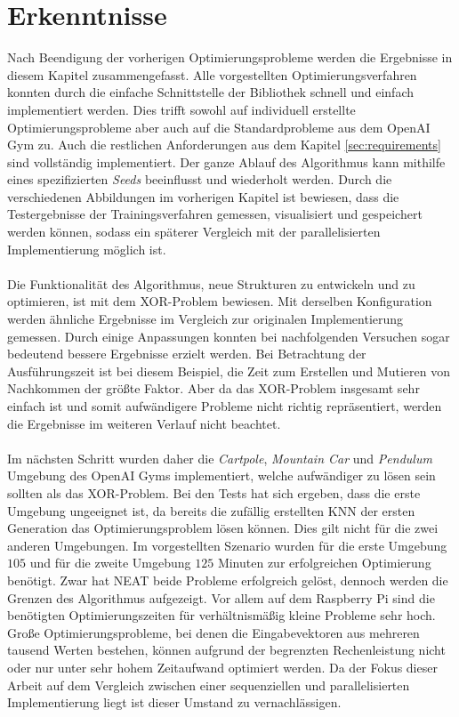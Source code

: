 \section{Erkenntnisse}
\label{sec:analysis_results}
Nach Beendigung der vorherigen Optimierungsprobleme werden die Ergebnisse in diesem Kapitel zusammengefasst. Alle vorgestellten Optimierungsverfahren konnten durch die einfache Schnittstelle der Bibliothek schnell und einfach implementiert werden. Dies trifft sowohl auf individuell erstellte Optimierungsprobleme aber auch auf die Standardprobleme aus dem OpenAI Gym zu. Auch die restlichen Anforderungen aus dem Kapitel \ref{sec:requirements} sind vollständig implementiert. Der ganze Ablauf des Algorithmus kann mithilfe eines spezifizierten \emph{Seeds} beeinflusst und wiederholt werden. Durch die verschiedenen Abbildungen im vorherigen Kapitel ist bewiesen, dass die Testergebnisse der Trainingsverfahren gemessen, visualisiert und gespeichert werden können, sodass ein späterer Vergleich mit der parallelisierten Implementierung möglich ist.
\\\\
Die Funktionalität des Algorithmus, neue Strukturen zu entwickeln und zu optimieren, ist mit dem XOR-Problem bewiesen. Mit derselben Konfiguration werden ähnliche Ergebnisse im Vergleich zur originalen Implementierung gemessen. Durch einige Anpassungen konnten bei nachfolgenden Versuchen sogar bedeutend bessere Ergebnisse erzielt werden. Bei Betrachtung der Ausführungszeit ist bei diesem Beispiel, die Zeit zum Erstellen und Mutieren von Nachkommen der größte Faktor. Aber da das XOR-Problem insgesamt sehr einfach ist und somit aufwändigere Probleme nicht richtig repräsentiert, werden die Ergebnisse im weiteren Verlauf nicht beachtet.
\\\\
Im nächsten Schritt wurden daher die \emph{Cartpole}, \emph{Mountain Car} und \emph{Pendulum} Umgebung des OpenAI Gyms implementiert, welche aufwändiger zu lösen sein sollten als das XOR-Problem. Bei den Tests hat sich ergeben, dass die erste Umgebung ungeeignet ist, da bereits die zufällig erstellten \ac{KNN} der ersten Generation das Optimierungsproblem lösen können. Dies gilt nicht für die zwei anderen Umgebungen. Im vorgestellten Szenario wurden für die erste Umgebung $105$ und für die zweite Umgebung $125$ Minuten zur erfolgreichen Optimierung benötigt. Zwar hat \ac{NEAT} beide Probleme erfolgreich gelöst, dennoch werden die Grenzen des Algorithmus aufgezeigt. Vor allem auf dem Raspberry Pi sind die benötigten Optimierungszeiten für verhältnismäßig kleine Probleme sehr hoch. Große Optimierungsprobleme, bei denen die Eingabevektoren aus mehreren tausend Werten bestehen, können aufgrund der begrenzten Rechenleistung nicht oder nur unter sehr hohem Zeitaufwand optimiert werden. Da der Fokus dieser Arbeit auf dem Vergleich zwischen einer sequenziellen und parallelisierten Implementierung liegt ist dieser Umstand zu vernachlässigen.
